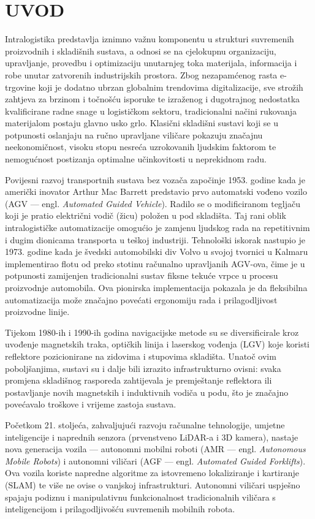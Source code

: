 \documentclass[12pt,a4paper]{article}
\begin{document}
\section{UVOD}
Intralogistika predstavlja iznimno važnu komponentu u strukturi suvremenih proizvodnih i skladišnih sustava, a odnosi se na cjelokupnu organizaciju, upravljanje, provedbu i optimizaciju unutarnjeg toka materijala, informacija i robe unutar zatvorenih industrijskih prostora. Zbog nezapamćenog rasta e-trgovine koji je dodatno ubrzan globalnim trendovima digitalizacije, sve strožih zahtjeva za brzinom i točnošću isporuke te izraženog i dugotrajnog nedostatka kvalificirane radne snage u logističkom sektoru, tradicionalni načini rukovanja materijalom postaju glavno usko grlo. Klasični skladišni sustavi koji se u potpunosti oslanjaju na ručno upravljane viličare pokazuju značajnu neekonomičnost, visoku stopu nesreća uzrokovanih ljudskim faktorom te nemogućnost postizanja optimalne učinkovitosti u neprekidnom radu.

Povijesni razvoj transportnih sustava bez vozača započinje 1953. godine kada je američki inovator Arthur Mac Barrett predstavio prvo automatski vođeno vozilo (AGV — engl. \textit{Automated Guided Vehicle}). Radilo se o modificiranom tegljaču koji je pratio električni vodič (žicu) položen u pod skladišta. Taj rani oblik intralogističke automatizacije omogućio je zamjenu ljudskog rada na repetitivnim i dugim dionicama transporta u teškoj industriji. Tehnološki iskorak nastupio je 1973. godine kada je švedski automobilski div Volvo u svojoj tvornici u Kalmaru implementirao flotu od preko stotinu računalno upravljanih AGV-ova, čime je u potpunosti zamijenjen tradicionalni sustav fiksne tekuće vrpce u procesu proizvodnje automobila. Ova pionirska implementacija pokazala je da fleksibilna automatizacija može značajno povećati ergonomiju rada i prilagodljivost proizvodne linije.

Tijekom 1980-ih i 1990-ih godina navigacijske metode su se diversificirale kroz uvođenje magnetskih traka, optičkih linija i laserskog vođenja (LGV) koje koristi reflektore pozicionirane na zidovima i stupovima skladišta. Unatoč ovim poboljšanjima, sustavi su i dalje bili izrazito infrastrukturno ovisni: svaka promjena skladišnog rasporeda zahtijevala je premještanje reflektora ili postavljanje novih magnetskih i induktivnih vodiča u podu, što je značajno povećavalo troškove i vrijeme zastoja sustava.

Početkom 21. stoljeća, zahvaljujući razvoju računalne tehnologije, umjetne inteligencije i naprednih senzora (prvenstveno LiDAR-a i 3D kamera), nastaje nova generacija vozila — autonomni mobilni roboti (AMR — engl. \textit{Autonomous Mobile Robots}) i autonomni viličari (AGF — engl. \textit{Automated Guided Forklifts}). Ova vozila koriste napredne algoritme za istovremeno lokaliziranje i kartiranje (SLAM) te više ne ovise o vanjskoj infrastrukturi. Autonomni viličari uspješno spajaju podiznu i manipulativnu funkcionalnost tradicionalnih viličara s inteligencijom i prilagodljivošću suvremenih mobilnih robota.
\end{document}
